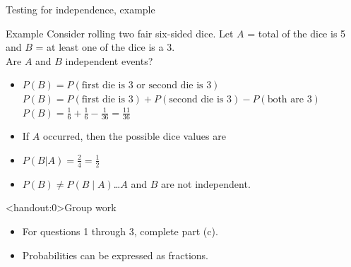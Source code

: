 \documentclass[xcolor=table, aspectratio=169, bigger, handout]{beamer}
\begin{document}
\begin{frame}{Testing for independence, example}
\begin{exampleblock}{Example}
Consider rolling two fair six-sided dice. Let $A$ = total of the dice is 5 and $B$ = at least one of the dice is a 3.\\
\medskip
Are $A$ and $B$ independent events?
\begin{itemize}
\pause
\item $P(B) = P(\text{first die is 3 or second die is 3}) $\\
$P(B) = P(\text{first die is 3}) + P(\text{second die is 3}) - P(\text{both are 3}) $\\
$P(B) = \frac 1 6 + \frac 1 6 - \frac 1 {36} = \frac {11}{36}$
\pause
\item If $A$ occurred, then the possible dice values are\\ \smallskip
{} \smallskip

\pause
\item $P(B|A) = \frac 2 4 = \frac 1 2$

\pause
\item $P(B) \ne P(B \mid A)$\ldots $A$ and $B$ are not independent.
\end{itemize} 
\end{exampleblock}
\end{frame}

\begin{frame}<handout:0>{Group work}
\begin{block}{}
\large
\begin{itemize}
\item For questions 1 through 3, complete part (c).
\item Probabilities can be expressed as fractions.
\end{itemize}
\end{block}
\end{frame}
\end{document}
